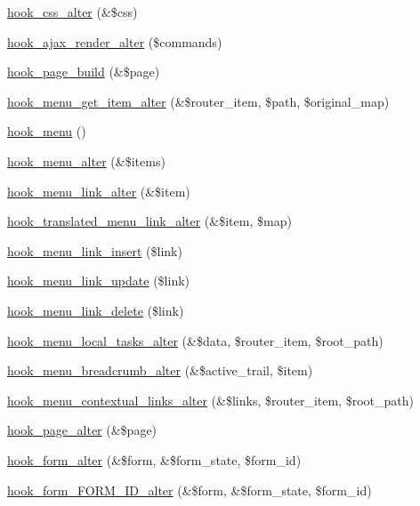 \begin{DoxyCompactItemize}
\item 
\hyperlink{group__hooks_ga5337e8bfa5713fb37c132f039c0169da}{hook\_\-css\_\-alter} (\&\$css)
\item 
\hyperlink{group__hooks_ga52f3fed51f62747155cfd2b373de4ec6}{hook\_\-ajax\_\-render\_\-alter} (\$commands)
\item 
\hyperlink{group__hooks_ga16d8d8ae818dc759bbe539e16ff5b93b}{hook\_\-page\_\-build} (\&\$page)
\item 
\hyperlink{group__hooks_ga452b92c6bb89d61eefe0a86430c62d73}{hook\_\-menu\_\-get\_\-item\_\-alter} (\&\$router\_\-item, \$path, \$original\_\-map)
\item 
\hyperlink{group__hooks_ga5c95244fea59b25666e409759e133ded}{hook\_\-menu} ()
\item 
\hyperlink{group__hooks_ga4c37deddcf48dbfe6f3081df1652f6fa}{hook\_\-menu\_\-alter} (\&\$items)
\item 
\hyperlink{group__hooks_ga53f6d87f599e7f585ca84a7e0874df81}{hook\_\-menu\_\-link\_\-alter} (\&\$item)
\item 
\hyperlink{group__hooks_ga5b5395b90c4987e29c6f6430fc066e8c}{hook\_\-translated\_\-menu\_\-link\_\-alter} (\&\$item, \$map)
\item 
\hyperlink{group__hooks_ga834a576b88ca7a08ce1244469fabb116}{hook\_\-menu\_\-link\_\-insert} (\$link)
\item 
\hyperlink{group__hooks_gafd2d5cc2a49cf37a637201eb76a41d1d}{hook\_\-menu\_\-link\_\-update} (\$link)
\item 
\hyperlink{group__hooks_gaf08037b21bd31aa8d2b12e988da7e2fb}{hook\_\-menu\_\-link\_\-delete} (\$link)
\item 
\hyperlink{group__hooks_gac828fb6b28f1a8bb01c444a9b2331f5f}{hook\_\-menu\_\-local\_\-tasks\_\-alter} (\&\$data, \$router\_\-item, \$root\_\-path)
\item 
\hyperlink{group__hooks_ga5a6dd6ead08b6dab4fe1307eb599e34a}{hook\_\-menu\_\-breadcrumb\_\-alter} (\&\$active\_\-trail, \$item)
\item 
\hyperlink{group__hooks_ga2731120f62502453acd650710f8252b9}{hook\_\-menu\_\-contextual\_\-links\_\-alter} (\&\$links, \$router\_\-item, \$root\_\-path)
\item 
\hyperlink{group__hooks_gaa965aa8f38b48aed1a19c556c199145f}{hook\_\-page\_\-alter} (\&\$page)
\item 
\hyperlink{group__hooks_ga6df3cea27ae1407aeef4eae5444cb213}{hook\_\-form\_\-alter} (\&\$form, \&\$form\_\-state, \$form\_\-id)
\item 
\hyperlink{group__hooks_ga8d4a4089551493d55911bd5c4f218264}{hook\_\-form\_\-FORM\_\-ID\_\-alter} (\&\$form, \&\$form\_\-state, \$form\_\-id)

\end{DoxyCompactItemize}
